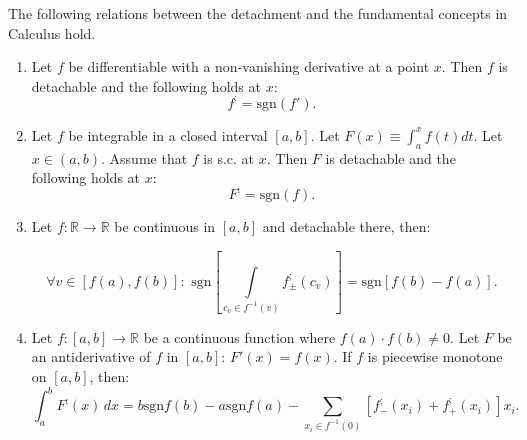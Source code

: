 \documentclass[11pt]{book}
\begin{document}
\begin{theorem}The following relations between the detachment and the fundamental concepts in Calculus hold.

\begin{enumerate}

\item Let $f$ be differentiable with a non-vanishing derivative at a point $x$. Then $f$ is detachable and the following holds at $x$:
$$f^{;}= \text{sgn}\left(f'\right).$$
\item Let $f$ be integrable in a closed interval $\left[a,b\right]$. Let $F\left(x\right)\equiv \int_a^x f\left(t\right)dt$. Let $x\in\left(a,b\right)$. Assume that $f$ is s.c. at $x.$ Then $F$ is detachable and the following holds at $x$:
$$F^{;}= \text{sgn}\left(f\right).$$

\item Let $f:\mathbb{R}\rightarrow\mathbb{R}$ be continuous in $\left[a,b\right]$ and detachable
there, then:

$$\forall v\in\left[f\left(a\right),f\left(b\right)\right]:\,\,\text{sgn}\left[\underset{c_{v}\in f^{-1}\left(v\right)}{\int}f_{\pm}^{;}\left(c_{v}\right)\right]=\text{sgn}\left[f\left(b\right)-f\left(a\right)\right].$$

\item Let $f:\left[a,b\right]\rightarrow\mathbb{R}$ be a continuous function where $f(a)\cdot f(b)\neq 0$. Let $F$ be an antiderivative of $f$ in $\left[a,b\right]$: $F'(x)=f(x)$. If $f$ is piecewise monotone on $\left[a,b\right]$, then:
$$\int_{a}^{b}F^{;}(x)\,dx=b\text{sgn}f\left(b\right)-a\text{sgn}f\left(a\right)-\underset{x_{i}\in f^{-1}\left(0\right)}{\sum}\left[f_{-}^{;}\left(x_{i}\right)+f_{+}^{;}\left(x_{i}\right)\right]x_{i}.$$
\end{enumerate}
\label{semi_discrete_fundamental}
\end{theorem}
\end{document}
